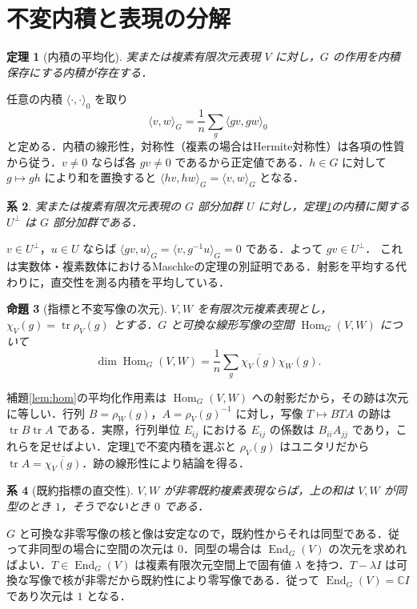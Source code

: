 \documentclass[a5paper,10pt,onecolumn]{jsarticle}
\makeatletter
\theoremstyle{mathnotetheorem}
\newtheorem{theorem}{定理}[section]
\newtheorem{proposition}[theorem]{命題}
\newtheorem{corollary}[theorem]{系}
\renewcommand{\proofname}{証明}
\renewenvironment{proof}[1][\proofname]{%
  \par\pushQED{\qed}\normalfont\topsep4\p@\@plus2\p@\relax
  \trivlist\item[\hskip\labelsep\bfseries #1]\ignorespaces
}{\popQED\endtrivlist\@endpefalse}
\makeatother
\begin{document}
\section{不変内積と表現の分解}
\begin{theorem}[内積の平均化]\label{thm:metric}
実または複素有限次元表現 $V$ に対し，$G$ の作用を内積保存にする内積が存在する．
\end{theorem}
\begin{proof}
任意の内積 $\langle\cdot,\cdot\rangle_0$ を取り
\[
 \langle v,w\rangle_G=\frac1n\sum_g\langle gv,gw\rangle_0
\]
と定める．内積の線形性，対称性（複素の場合はHermite対称性）は各項の性質から従う．$v\ne0$ ならば各 $gv\ne0$ であるから正定値である．$h\in G$ に対して $g\mapsto gh$ により和を置換すると $\langle hv,hw\rangle_G=\langle v,w\rangle_G$ となる．
\end{proof}
\begin{corollary}
実または複素有限次元表現の $G$ 部分加群 $U$ に対し，定理\ref{thm:metric}の内積に関する $U^\perp$ は $G$ 部分加群である．
\end{corollary}
\begin{proof}
$v\in U^\perp$，$u\in U$ ならば $\langle gv,u\rangle_G=\langle v,g^{-1}u\rangle_G=0$ である．よって $gv\in U^\perp$．
\end{proof}
これは実数体・複素数体におけるMaschkeの定理の別証明である．射影を平均する代わりに，直交性を測る内積を平均している．

\begin{proposition}[指標と不変写像の次元]
$V,W$ を有限次元複素表現とし，$\chi_V(g)=\operatorname{tr}\rho_V(g)$ とする．$G$ と可換な線形写像の空間 $\operatorname{Hom}_G(V,W)$ について
\[
 \dim\operatorname{Hom}_G(V,W)
 =\frac1n\sum_g\overline{\chi_V(g)}\chi_W(g).
\]
\end{proposition}
\begin{proof}
補題\ref{lem:hom}の平均化作用素は $\operatorname{Hom}_G(V,W)$ への射影だから，その跡は次元に等しい．行列 $B=\rho_W(g)$，$A=\rho_V(g)^{-1}$ に対し，写像 $T\mapsto BTA$ の跡は $\operatorname{tr}B\operatorname{tr}A$ である．実際，行列単位 $E_{ij}$ における $E_{ij}$ の係数は $B_{ii}A_{jj}$ であり，これらを足せばよい．定理\ref{thm:metric}で不変内積を選ぶと $\rho_V(g)$ はユニタリだから $\operatorname{tr}A=\overline{\chi_V(g)}$．跡の線形性により結論を得る．
\end{proof}
\begin{corollary}[既約指標の直交性]
$V,W$ が非零既約複素表現ならば，上の和は $V,W$ が同型のとき $1$，そうでないとき $0$ である．
\end{corollary}
\begin{proof}
$G$ と可換な非零写像の核と像は安定なので，既約性からそれは同型である．従って非同型の場合に空間の次元は $0$．同型の場合は $\operatorname{End}_G(V)$ の次元を求めればよい．$T\in\operatorname{End}_G(V)$ は複素有限次元空間上で固有値 $\lambda$ を持つ．$T-\lambda I$ は可換な写像で核が非零だから既約性により零写像である．従って $\operatorname{End}_G(V)=\mathbb C I$ であり次元は $1$ となる．
\end{proof}
\end{document}
